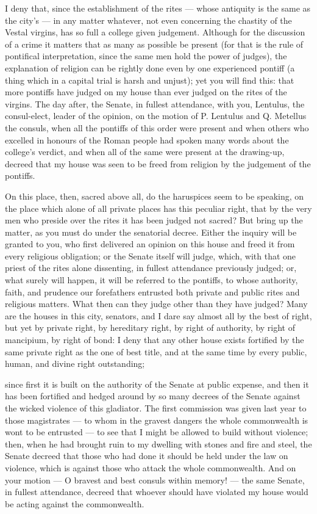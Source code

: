  I deny that, since the establishment of the rites --- whose antiquity is the same as the city's --- in any matter whatever, not even concerning the chastity of the Vestal virgins, has so full a college given judgement. Although for the discussion of a crime it matters that as many as possible be present (for that is the rule of pontifical interpretation, since the same men hold the power of judges), the explanation of religion can be rightly done even by one experienced pontiff (a thing which in a capital trial is harsh and unjust); yet you will find this: that more pontiffs have judged on my house than ever judged on the rites of the virgins. The day after, the Senate, in fullest attendance, with you, Lentulus, the consul-elect, leader of the opinion, on the motion of P. Lentulus and Q. Metellus the consuls, when all the pontiffs of this order were present and when others who excelled in honours of the Roman people had spoken many words about the college's verdict, and when all of the same were present at the drawing-up, decreed that my house was seen to be freed from religion by the judgement of the pontiffs.

 On this place, then, sacred above all, do the haruspices seem to be speaking, on the place which alone of all private places has this peculiar right, that by the very men who preside over the rites it has been judged not sacred? But bring up the matter, as you must do under the senatorial decree. Either the inquiry will be granted to you, who first delivered an opinion on this house and freed it from every religious obligation; or the Senate itself will judge, which, with that one priest of the rites alone dissenting, in fullest attendance previously judged; or, what surely will happen, it will be referred to the pontiffs, to whose authority, faith, and prudence our forefathers entrusted both private and public rites and religious matters. What then can they judge other than they have judged? Many are the houses in this city, senators, and I dare say almost all by the best of right, but yet by private right, by hereditary right, by right of authority, by right of mancipium, by right of bond: I deny that any other house exists fortified by the same private right as the one of best title, and at the same time by every public, human, and divine right outstanding;

 since first it is built on the authority of the Senate at public expense, and then it has been fortified and hedged around by so many decrees of the Senate against the wicked violence of this gladiator. The first commission was given last year to those magistrates --- to whom in the gravest dangers the whole commonwealth is wont to be entrusted --- to see that I might be allowed to build without violence; then, when he had brought ruin to my dwelling with stones and fire and steel, the Senate decreed that those who had done it should be held under the law on violence, which is against those who attack the whole commonwealth. And on your motion --- O bravest and best consuls within memory! --- the same Senate, in fullest attendance, decreed that whoever should have violated my house would be acting against the commonwealth.

